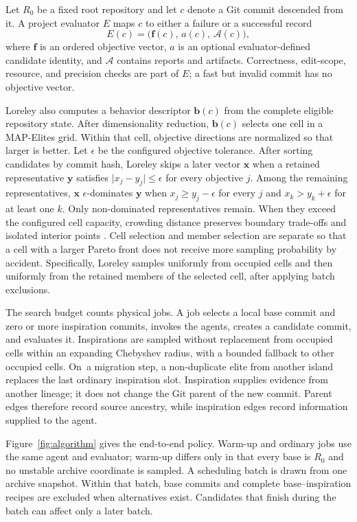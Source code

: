 \documentclass[10pt,twocolumn]{article}
\begin{document}
Let $R_0$ be a fixed root repository and let $c$ denote a Git commit descended
from it. A project evaluator $E$ maps $c$ to either a failure or a successful
record
\begin{equation}
 E(c) = \bigl(\mathbf{f}(c),\, a(c),\, \mathcal{A}(c)\bigr),
\end{equation}
where $\mathbf{f}$ is an ordered objective vector, $a$ is an optional
evaluator-defined candidate identity, and $\mathcal{A}$ contains reports and
artifacts. Correctness, edit-scope, resource, and precision checks are part of
$E$; a fast but invalid commit has no objective vector.

Loreley also computes a behavior descriptor $\mathbf{b}(c)$ from the complete
eligible repository state. After dimensionality reduction, $\mathbf{b}(c)$
selects one cell in a MAP-Elites grid. Within that cell, objective directions
are normalized so that larger is better. Let $\epsilon$ be the configured
objective tolerance. After sorting candidates by commit hash, Loreley skips a
later vector $\mathbf{x}$ when a retained representative $\mathbf{y}$
satisfies $\lvert x_j-y_j\rvert\leq\epsilon$ for every objective $j$.
Among the remaining representatives, $\mathbf{x}$
$\epsilon$-dominates $\mathbf{y}$ when
$x_j\geq y_j-\epsilon$ for every $j$ and
$x_k>y_k+\epsilon$ for at least one $k$. Only non-dominated
representatives remain. When they exceed the configured cell capacity,
crowding distance preserves boundary trade-offs and isolated interior points
\citep{deb2002nsga2}. Cell selection and member selection are separate so that
a cell with a larger Pareto front does not receive more sampling probability by
accident. Specifically, Loreley samples uniformly from occupied cells and then
uniformly from the retained members of the selected cell, after applying batch
exclusions.

The search budget counts physical jobs. A job selects a local base commit and
zero or more inspiration commits, invokes the agents, creates a candidate
commit, and evaluates it. Inspirations are sampled without replacement from
occupied cells within an expanding Chebyshev radius, with a bounded fallback to
other occupied cells. On~a migration step, a non-duplicate elite from another
island replaces the last ordinary inspiration slot. Inspiration supplies
evidence from another lineage; it does not change the Git parent of the new
commit. Parent edges therefore record source ancestry, while inspiration edges
record information supplied to the agent.

Figure~\ref{fig:algorithm} gives the end-to-end policy. Warm-up and ordinary
jobs use the same agent and evaluator; warm-up differs only in that every base
is $R_0$ and no unstable archive coordinate is sampled. A scheduling batch is
drawn from one archive snapshot. Within that batch, base commits and complete
base--inspiration recipes are excluded when alternatives exist. Candidates
that finish during the batch can affect only a later batch.
\end{document}
